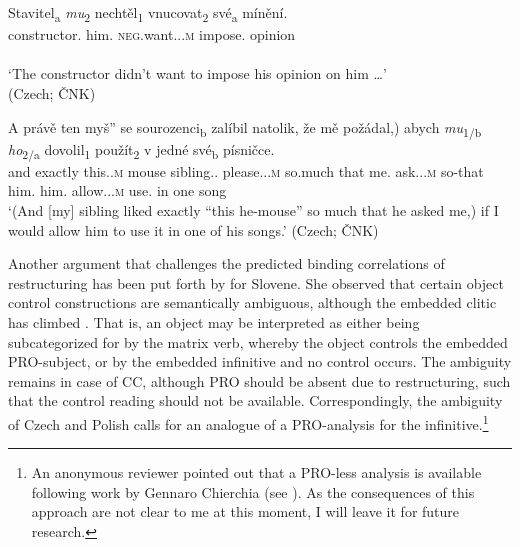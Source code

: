 \documentclass[output=paper,colorlinks,citecolor=brown]{langscibook}
\begin{document}
\ea\label{kul:ex:stavitel-mu}
\gll Stavitel\textsubscript{a} \textit{mu}\textsubscript{2} nechtěl\textsubscript{1} vnucovat\textsubscript{2} své\textsubscript{a} mínění.\\
constructor.{\NOM} him.{\DAT} \textsc{neg}.want.{\PST.\SG.}\textsc{m} impose.{\INF} {\POSS} opinion \\
\glt […]\\`The constructor didn’t want to impose his opinion on him …’ \\ \hfill (Czech; ČNK)
\z

\ea\label{kul:ex:a-prave}
\gll \minsp{(} A právě \minsp{[\textsubscript{\textsc{np}}}  ten myš”\minsp{]\textsubscript{a}} se sourozenci\textsubscript{b} zalíbil natolik, že mě požádal,) abych \textit{mu}\textsubscript{1/b} \textit{ho}\textsubscript{2/a} dovolil\textsubscript{1} použít\textsubscript{2} v jedné své\textsubscript{b} písničce.\\
{} and exactly {} {} this.{\SG.}\textsc{m} mouse {\REFL} sibling.{\SG.\DAT} please.{\PST.\SG.}\textsc{m} so.much that me.{\ACC} ask.{\PST.\SG.}\textsc{m} so-that him.{\DAT} him.{\ACC} allow.{\PST.\SG.}\textsc{m} use.{\INF} in one {\POSS} song\\
\glt `(And [my] sibling liked exactly “this he-mouse” so much that he asked me,) if I would allow him to use it in one of his songs.’ \hfill (Czech; ČNK)
\z

\noindent Another argument that challenges the predicted binding correlations of restructuring has been put forth by \citet[316]{Golden2008} for Slovene. She observed that certain object control constructions are semantically ambiguous, although the embedded clitic has climbed . That is, an object may be interpreted as either being subcategorized for by the matrix verb, whereby the object controls the embedded PRO-subject, or by the embedded infinitive and no control occurs. The ambiguity remains in case of CC, although PRO should be absent due to restructuring, such that the control reading should not be available. Correspondingly, the ambiguity of Czech  and Polish  calls for an analogue of a PRO-analysis for the infinitive.\footnote{An anonymous reviewer pointed out that a PRO-less analysis is available following work by Gennaro Chierchia (see \citealt{Chierchia1984}). As the consequences of this approach are not clear to me at this moment, I will leave it for future research.}
\end{document}
